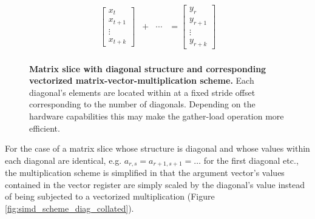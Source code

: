 \documentclass{article}
\begin{document}
\begin{figure}[ht]
$$\begin{matrix}
\begin{bmatrix}
                                                                                x_t \\
                                                                                x_{t+1} \\
                                                                                \vdots \\
                                                                                x_{t+k}
                                                                              \end{bmatrix} & + & \cdots & = \begin{bmatrix}
                                                                                                                 y_{r} \\
                                                                                                                 y_{r+1} \\
                                                                                                                 \vdots \\
                                                                                                                 y_{r+k}
                                                                                                                \end{bmatrix}\\

        \end{matrix}
        $$
        \caption[Matrix slice with diagonal structure and corresponding vectorized matrix-vector-multiplication scheme.]{\textbf{Matrix slice with diagonal structure and corresponding vectorized matrix-vector-multiplication scheme.} Each diagonal's elements are located within \V at a fixed stride offset corresponding to the number of diagonals. Depending on the hardware capabilities this may make the gather-load operation more efficient.}
        \label{fig:simd_scheme_diag}
      \end{figure}

      For the case of a matrix slice whose structure is diagonal and whose values within each diagonal are identical, e.g. $a_{r,s} = a_{r+1, s+1} = \ldots$ for the first diagonal etc., the multiplication scheme is simplified in that the argument vector's values contained in the vector register are simply scaled by the diagonal's value instead of being subjected to a vectorized multiplication (Figure \ref{fig:simd_scheme_diag_collated}).
\end{document}
